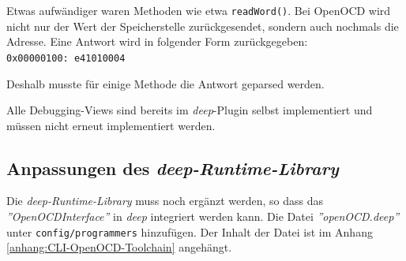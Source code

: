 Etwas aufwändiger waren Methoden wie etwa \texttt{readWord()}.
Bei OpenOCD wird nicht nur der Wert der Speicherstelle zurückgesendet, sondern auch nochmals die Adresse.
Eine Antwort wird in folgender Form zurückgegeben:\\
\texttt{0x00000100: e41010004}

Deshalb musste für einige Methode die Antwort geparsed werden.

Alle Debugging-Views sind bereits im \textit{deep}-Plugin selbst implementiert und müssen nicht erneut implementiert werden. 



\subsection{Anpassungen des \textit{deep-Runtime-Library}}
Die \textit{deep-Runtime-Library} muss noch ergänzt werden, so dass das \textit{''OpenOCDInterface''} in \textit{deep} integriert werden kann.
Die Datei \textit{''openOCD.deep''} unter \texttt{config/programmers} hinzufügen.
Der Inhalt der Datei ist im Anhang \ref{anhang:CLI-OpenOCD-Toolchain} angehängt.


